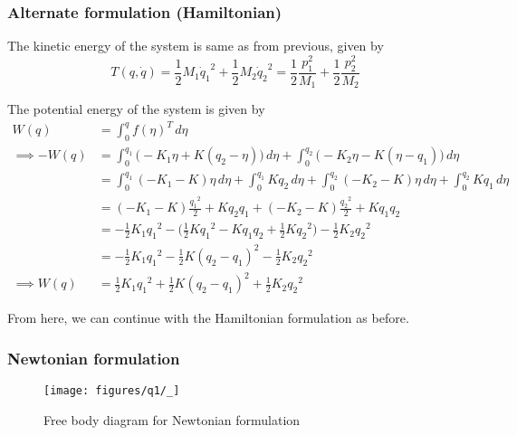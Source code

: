 \clearpage
\subsubsection*{Alternate formulation (Hamiltonian)}

The kinetic energy of the system is same as from previous, given by
\begin{equation*}
    T(q, \dot q)
    =
    \frac{1}{2} M_1 {\dot q_1}^2
    + \frac{1}{2} M_2 {\dot q_2}^2
    =
    \frac{1}{2} \frac{p_1^2}{M_1}
    + \frac{1}{2} \frac{p_2^2}{M_2}
\end{equation*}

The potential energy of the system is given by
\begin{align*}
    W(q)
     & =
    \int_{0}^{q} {f(\eta)}^T \, d\eta
    \\
    \implies
    - W(q)
     & =
    \int_{0}^{q_1} \Big( -K_1 \eta + K (q_2 - \eta) \Big)\, d\eta
    + \int_{0}^{q_2} \Big( -K_2 \eta - K (\eta - q_1) \Big)\, d\eta
    \\ & =
    \int_{0}^{q_1} (-K_1 - K)\eta \, d\eta
    + \int_{0}^{q_1} K q_2 \, d\eta
    + \int_{0}^{q_2} (-K_2 - K)\eta \, d\eta
    + \int_{0}^{q_2} K q_1 \, d\eta
    \\ & =
    (-K_1 - K) \frac{{q_1}^2}{2} + K q_2 q_1 + (-K_2 - K) \frac{{q_2}^2}{2} + K q_1 q_2
    \\ & =
    -\frac{1}{2} K_1 {q_1}^2 - \Big( \frac{1}{2} K {q_1}^2 - K q_1 q_2 + \frac{1}{2} K {q_2}^2 \Big) - \frac{1}{2} K_2 {q_2}^2
    \\ & =
    -\frac{1}{2} K_1 {q_1}^2 - \frac{1}{2} K {(q_2 - q_1)}^2 - \frac{1}{2} K_2 {q_2}^2
    \\
    \implies W(q)
     & =
    \frac{1}{2} K_1 {q_1}^2 + \frac{1}{2} K {(q_2 - q_1)}^2 + \frac{1}{2} K_2 {q_2}^2
\end{align*}

From here, we can continue with the Hamiltonian formulation as before.

\clearpage
\subsubsection*{Newtonian formulation}

\begin{figure}[htb]
    \centering
    \texttt{[image: figures/q1/\_]}
    \caption{
        Free body diagram for Newtonian formulation
    }\label{fig:q1-newtonian}
\end{figure}

